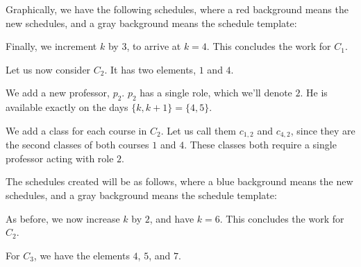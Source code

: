 Graphically, we have the following schedules, where a {\color{BrickRed}red} background means the new schedules, and a {\color{gray}gray} background means the schedule template:

\begin{center}
\end{center}

Finally, we increment $k$ by $3$, to arrive at $k = 4$. This concludes the work for {\color{BrickRed}$C_1$}.

Let us now consider {\color{Blue}$C_2$}. It has two elements, $1$ and $4$.

We add a new professor, $p_2$. $p_2$ has a single role, which we'll denote $2$. He is available exactly on the days $\{k, k + 1\} = \{4, 5\}$.

We add a class for each course in {\color{Blue}$C_2$}. Let us call them $c_{1, 2}$ and $c_{4, 2}$, since they are the second classes of both courses $1$ and $4$. These classes both require a single professor acting with role $2$.

The schedules created will be as follows, where a {\color{Blue}blue} background means the new schedules, and a {\color{gray}gray} background means the schedule template:

\begin{center}
\end{center}

As before, we now increase $k$ by $2$, and have $k = 6$. This concludes the work for {\color{Blue}$C_2$}.

For {\color{Fuchsia} $C_3$}, we have the elements $4$, $5$, and $7$. 

